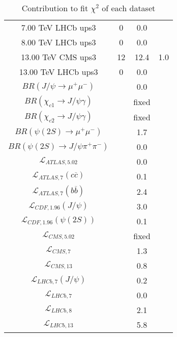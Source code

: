\begin{table}[h!]
\begin{tabular}{c|c|c|c}
7.00 TeV LHCb ups3 & 0 & 0.0 &  \\
8.00 TeV LHCb ups3 & 0 & 0.0 &  \\
13.00 TeV CMS ups3 & 12 & 12.4 & 1.0 \\
13.00 TeV LHCb ups3 & 0 & 0.0 &  \\
\hline
$BR(J/\psi\rightarrow\mu^+\mu^-)$ &  & 0.0 &  \\
$BR(\chi_{c1}\rightarrow J/\psi\gamma)$ &  & fixed & \\
$BR(\chi_{c2}\rightarrow J/\psi\gamma)$ &  & fixed & \\
$BR(\psi(2S)\rightarrow\mu^+\mu^-)$ &  & 1.7 &  \\
$BR(\psi(2S)\rightarrow J/\psi\pi^+\pi^-)$ &  & 0.0 &  \\
$\mathcal L_{ATLAS,5.02}$ &  & 0.0 &  \\
$\mathcal L_{ATLAS,7}(c\overline c)$ &  & 0.1 &  \\
$\mathcal L_{ATLAS,7}(b\overline b)$ &  & 2.4 &  \\
$\mathcal L_{CDF,1.96}(J/\psi)$ &  & 3.0 &  \\
$\mathcal L_{CDF,1.96}(\psi(2S))$ &  & 0.1 &  \\
$\mathcal L_{CMS,5.02}$ &  & fixed & \\
$\mathcal L_{CMS,7}$ &  & 1.3 &  \\
$\mathcal L_{CMS,13}$ &  & 0.8 &  \\
$\mathcal L_{LHCb,7}(J/\psi)$ &  & 0.2 &  \\
$\mathcal L_{LHCb,7}$ &  & 0.0 &  \\
$\mathcal L_{LHCb,8}$ &  & 2.1 &  \\
$\mathcal L_{LHCb,13}$ &  & 5.8 &  \\
\end{tabular}
\caption{Contribution to fit $\chi^2$ of each dataset}
\end{table}
